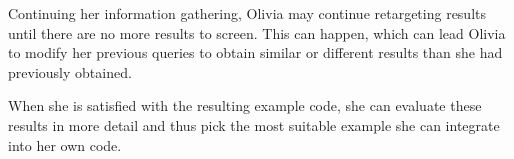 Continuing her information gathering, Olivia may continue retargeting results until there are no more results to screen. This can happen, which can lead Olivia to modify her previous queries to obtain similar or different results than she had previously obtained.

When she is satisfied with the resulting example code, she can evaluate these results in more detail and thus pick the most suitable example she can integrate into her own code.

